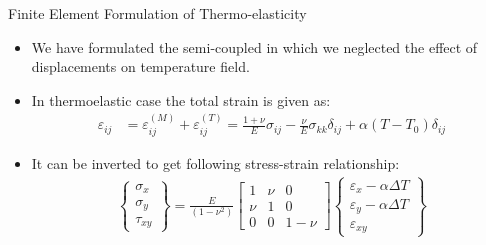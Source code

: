 \documentclass{beamer}
\begin{document}
\begin{frame}[t,fragile]{Finite Element Formulation of Thermo-elasticity}
\begin{itemize} 
\item We have formulated the semi-coupled in which we neglected the effect of displacements on temperature field. 
\item In thermoelastic case the total strain is given as: 
\begin{align*}
    \varepsilon_{ij}&=\varepsilon_{ij}^{(M)}+\varepsilon_{ij}^{(T)}
    =\frac{1+\nu}{E}\sigma_{ij}-\frac{\nu}{E}\sigma_{kk}\delta_{ij}+\alpha(T-T_0)\delta_{ij}\nonumber
\end{align*}
 
\item It can be inverted to get following stress-strain relationship:
    \footnotesize
\begin{align*}
    \begin{Bmatrix}
        \sigma_{x}\\ \sigma_{y}\\ \tau_{xy} 
    \end{Bmatrix} =\frac{E}{(1-\nu^2)}
    \begin{bmatrix}
        1 & \nu & 0 \\ \nu & 1 & 0 \\ 0 & 0 & 1-\nu 
    \end{bmatrix}
    \begin{Bmatrix}
        \varepsilon_{x}-\alpha\Delta T \\ \varepsilon_{y}-\alpha \Delta T \\ \varepsilon_{xy} 
    \end{Bmatrix}
\end{align*}
\end{itemize}

\end{frame}
\end{document}
